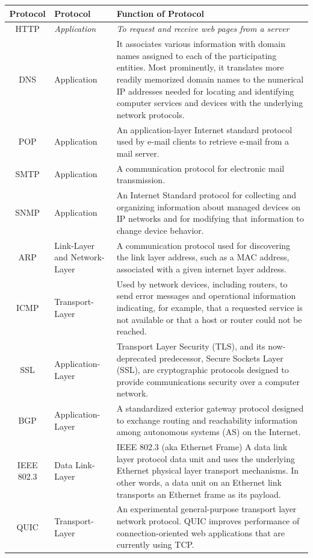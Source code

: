 \documentclass{article}
\begin{document}
\begin{center}
 \begin{longtable}{| c | m{8em} | m{30em} |} 
 \hline
 {\bf Protocol} & {\bf Protocol} & {\bf Function of Protocol} \\ [0.5ex]
 \hline\hline
HTTP & {\it Application} & 
{\it To request and receive web pages from a server} \\
 \hline
DNS & Application & 
It associates various information with domain names assigned to each of the participating entities. Most prominently, it translates more readily memorized domain names to the numerical IP addresses needed for locating and identifying computer services and devices with the underlying network protocols. \\
 \hline
POP & Application & 
An application-layer Internet standard protocol used by e-mail clients to retrieve e-mail from a mail server. \\
 \hline
SMTP & Application & 
A communication protocol for electronic mail transmission. \\
 \hline
SNMP & Application & 
An Internet Standard protocol for collecting and organizing information about managed devices on IP networks and for modifying that information to change device behavior. \\
 \hline
ARP & Link-Layer and Network-Layer & 
A communication protocol used for discovering the link layer address, such as a MAC address, associated with a given internet layer address. \\
 \hline
ICMP & Transport-Layer & 
Used by network devices, including routers, to send error messages and operational information indicating, for example, that a requested service is not available or that a host or router could not be reached. \\
 \hline
SSL & Application-Layer & 
Transport Layer Security (TLS), and its now-deprecated predecessor, Secure Sockets Layer (SSL), are cryptographic protocols designed to provide communications security over a computer network. \\
 \hline
BGP & Application-Layer & 
A standardized exterior gateway protocol designed to exchange routing and reachability information among autonomous systems (AS) on the Internet. \\
 \hline
IEEE 802.3 & Data Link-Layer & 
IEEE 802.3 (aka Ethernet Frame) A data link layer protocol data unit and uses the underlying Ethernet physical layer transport mechanisms. In other words, a data unit on an Ethernet link transports an Ethernet frame as its payload. \\
 \hline
QUIC & Transport-Layer & 
An experimental general-purpose transport layer network protocol. QUIC improves performance of connection-oriented web applications that are currently using TCP. \\
 \hline
\end{longtable}
\end{center}
\end{document}
